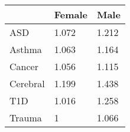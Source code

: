 \begin{table}[!tbp]
\begin{center}
\begin{tabular}{lll}
\hline\hline
\multicolumn{1}{l}{}&\multicolumn{1}{c}{Female}&\multicolumn{1}{c}{Male}\tabularnewline
\hline
ASD&1.072&1.212\tabularnewline
Asthma&1.063&1.164\tabularnewline
Cancer&1.056&1.115\tabularnewline
Cerebral&1.199&1.438\tabularnewline
T1D&1.016&1.258\tabularnewline
Trauma&1&1.066\tabularnewline
\hline
\end{tabular}\end{center}
\end{table}
